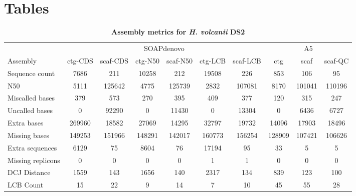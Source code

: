 \documentclass[10pt]{article}
\begin{document}
\section*{Tables}
\begin{table}[hp] 
\caption{ 
\bf{Assembly metrics for \textit{H. volcanii} DS2}}
\footnotesize
\begin{tabular}{l|cccccc|ccc}
&\multicolumn{6}{c|}{SOAPdenovo} & \multicolumn{3}{c}{A5} \\
Assembly           & ctg-CDS & scaf-CDS & ctg-N50 & scaf-N50 & ctg-LCB & scaf-LCB & ctg    & scaf     & scaf-QC \\
Sequence count     & 7686    & 211      & 10258   & 212      & 19508   & 226      & 853    & 106      & 95      \\
N50                & 5111    & 125642   & 4775    & 125739   & 2832    & 107081   & 8170   & 101041   & 110196  \\
Miscalled bases    & 379     & 573      & 270     & 395      & 409     & 377      & 120    & 315      & 247     \\
Uncalled bases     & 0       & 92290    & 0       & 11430    & 0       & 13304    & 0      & 6436     & 6727    \\
Extra bases        & 269960  & 18582    & 27069   & 14295    & 32797   & 19732    & 14096  & 17903    & 18496   \\
Missing bases      & 149253  & 151966   & 148291  & 142017   & 160773  & 156254   & 128909 & 107421   & 106626  \\
Extra sequences    & 6129    & 75       & 8604    & 76       & 17194   & 95       & 33     & 5        & 5       \\
Missing replicons  & 0       & 0        & 0       & 0        & 1       & 1        & 0      & 0        & 0       \\
DCJ Distance       & 1559    & 143      & 1656    & 140      & 2317    & 134      & 839    & 123      & 100     \\
LCB Count          & 15      & 22       & 9       & 14       & 7       & 10       & 45     & 55       & 28      \\

\end{tabular}
\end{table}
\end{document}
